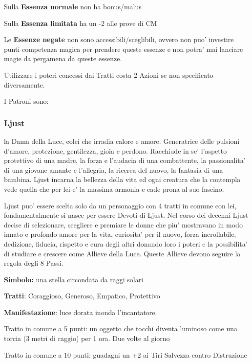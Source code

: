 \documentclass[a4paper,11pt,twoside,openany]{dndbook}
\begin{document}
{Sulla \textbf{Essenza normale} non ha bonus/malus

Sulla \textbf{Essenza limitata} ha un -2 alle prove di CM

Le \textbf{Essenze negate} non sono accessibili/sceglibili, ovvero non puo' investire punti competenza magica per prendere queste essenze e non potra' mai lanciare magie da pergamena da queste essenze.

Utilizzare i poteri concessi dai Tratti costa 2 Azioni se non specificato diversamente.

I Patroni sono:

\subsubsection{Ljust}

\label{ljust}

la Dama della Luce, colei che irradia calore e amore. Generatrice delle pulsioni d'amore, protezione, gentilezza, gioia e perdono. Racchiude in se' l'aspetto protettivo di una madre, la forza e l'audacia di una combattente, la passionalita' di una giovane amante e l'allegria, la ricerca del nuovo, la fantasia di una bambina. Ljust incarna la bellezza della vita ed ogni creatura che la contempla vede quella che per lei e' la massima armonia e cade prona al suo fascino.

Ljust puo' essere scelta solo da un personaggio con 4 tratti in comune con lei, fondamentalmente si nasce per essere Devoti di Ljust. Nel corso dei decenni Ljust decise di selezionare, scegliere e premiare le donne che piu' mostravano in modo innato e profondo amore per la vita, curiosita' per il nuovo, forza incrollabile, dedizione, fiducia, rispetto e cura degli altri donando loro i poteri e la possibilita' di studiare e crescere come Allieve della Luce. Queste Allieve devono seguire la regola degli 8 Passi.

\textbf{Simbolo:} una stella circondata da raggi solari

\textbf{Tratti}: Coraggioso, Generoso, Empatico, Protettivo

\textbf{Manifestazione}: luce dorata inonda l'incantatore.

\bigskip

Tratto in comune a 5 punti: un oggetto che tocchi diventa luminoso come una torcia (3 metri di raggio) per 1 ora. Due volte al giorno

Tratto in comune a 10 punti: guadagni un +2 ai Tiri Salvezza contro Distruzione

}
\end{document}
